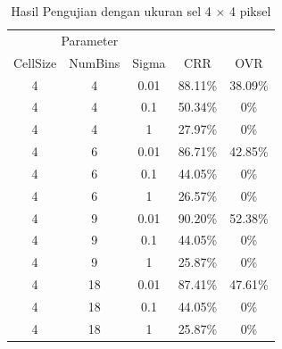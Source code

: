 \begin{longtable}[c]{|c|c|c|c|c|}
	\caption{Hasil Pengujian dengan ukuran sel 4 $\times$ 4 piksel}
	\label{tab:HasilPengujianSel4}\\
	\hline
	\multicolumn{3}{|c|}{Parameter} &                                &                                \\ \cline{1-3}
	CellSize   & NumBins   & Sigma  & \multirow{-2}{*}{CRR}          & \multirow{-2}{*}{OVR}          \\ \hline
	\endhead
	4          & 4         & 0.01   & 88.11\%                        & 38.09\% \\ \hline
	4          & 4         & 0.1    & 50.34\%                        & 0\%                            \\ \hline
	4          & 4         & 1      & 27.97\%                        & 0\%                            \\ \hline
	4          & 6         & 0.01   & 86.71\%                        & 42.85\%                         \\ \hline
	4          & 6         & 0.1    & 44.05\%                        & 0\%                            \\ \hline
	4          & 6         & 1      & 26.57\%                        & 0\%                            \\ \hline
	4          & 9         & 0.01   & {\color[HTML]{FE0000} 90.20\%} & {\color[HTML]{FE0000} 52.38\%} \\ \hline
	4          & 9         & 0.1    & 44.05\%                        & 0\%                            \\ \hline
	4          & 9         & 1      & 25.87\%                        & 0\%                            \\ \hline
	4          & 18        & 0.01   & 87.41\%                        & 47.61\%                         \\ \hline
	4          & 18        & 0.1    & 44.05\%                        & 0\%                            \\ \hline
	4          & 18        & 1      & 25.87\%                        & 0\%                            \\ \hline
\end{longtable}
